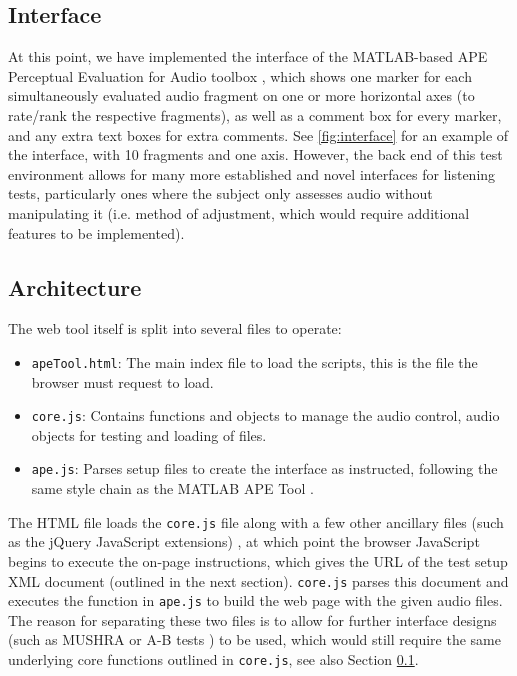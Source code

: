\documentclass{article}
\begin{document}
\subsection{Interface}\label{sec:interface} %

At this point, we have implemented the interface of the MATLAB-based APE Perceptual Evaluation for Audio toolbox \cite{deman2014b}, which shows one marker for each simultaneously evaluated audio fragment on one or more horizontal axes (to rate/rank the respective fragments), as well as a comment box for every marker, and any extra text boxes for extra comments. See \ref{fig:interface} for an example of the interface, with 10 fragments and one axis. However, the back end of this test environment allows for many more established and novel interfaces for listening tests, particularly ones where the subject only assesses audio without manipulating it (i.e. method of adjustment, which would require additional features to be implemented). 
%
%


\subsection{Architecture}\label{sec:architecture}

The web tool itself is split into several files to operate:
\begin{itemize}
\item \texttt{apeTool.html}: The main index file to load the scripts, this is the file the browser must request to load. %
\item \texttt{core.js}: Contains functions and objects to manage the audio control, audio objects for testing and loading of files. 
\item \texttt{ape.js}: Parses setup files to create the interface as instructed, following the same style chain as the MATLAB APE Tool \cite{deman2014b}.
\end{itemize}

The HTML file loads the \texttt{core.js} file along with a few other ancillary files (such as the jQuery JavaScript extensions)%
, at which point the browser JavaScript begins to execute the on-page instructions, which gives the URL of the test setup XML document (outlined in the next section). \texttt{core.js} parses this document and executes the function in \texttt{ape.js} to build the web page with the given audio files. The reason for separating these two files is to allow for further interface designs (such as MUSHRA \cite{mushra} or A-B tests \cite{bech}) to be used, which would still require the same underlying core functions outlined in \texttt{core.js}, see also Section \ref{sec:interface}.
\end{document}
